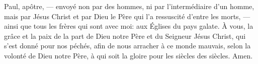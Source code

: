 Paul, apôtre,
	--- envoyé non par des hommes, ni par l’intermédiaire d’un homme,
	mais par Jésus Christ et par Dieu le Père qui l’a ressuscité d’entre les morts, ---
	ainsi que tous les frères qui sont avec moi: aux Églises du pays galate.
À vous, la grâce et la paix de la part de Dieu notre Père et du Seigneur Jésus Christ,
	qui s’est donné pour nos péchés, afin de nous arracher à ce monde mauvais,
	selon la volonté de Dieu notre Père,
	à qui soit la gloire pour les siècles des siècles. Amen.
